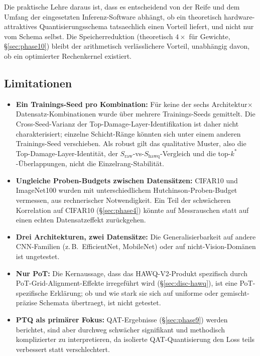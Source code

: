 Die praktische Lehre daraus ist, dass es entscheidend von der Reife und dem Umfang der eingesetzten Inferenz-Software abhängt, ob ein theoretisch hardware-attraktives Quantisierungsschema tatsaechlich einen Vorteil liefert, und nicht nur vom Schema selbst. Die Speicherreduktion (theoretisch $4\times$ für Gewichte, \S\ref{sec:phase10}) bleibt der arithmetisch verlässlichere Vorteil, unabhängig davon, ob ein optimierter Rechenkernel existiert.

\subsection{Limitationen}
\label{sec:limitations}

\begin{itemize}
\item \textbf{Ein Trainings-Seed pro Kombination:} Für keine der sechs Architektur$\times$Datensatz-Kombinationen wurde über mehrere Trainings-Seeds gemittelt. Die Cross-Seed-Varianz der Top-Damage-Layer-Identifikation ist daher nicht charakterisiert; einzelne Schicht-Ränge könnten sich unter einem anderen Trainings-Seed verschieben. Als robust gilt das qualitative Muster, also die Top-Damage-Layer-Identität, der $S_{\mathrm{raw}}$-vs-$S_{\mathrm{hawq}}$-Vergleich und die top-$k^*$-Überlappungen, nicht die Einzelrang-Stabilität.

\item \textbf{Ungleiche Proben-Budgets zwischen Datensätzen:} CIFAR10 und ImageNet100 wurden mit unterschiedlichem Hutchinson-Proben-Budget vermessen, aus rechnerischer Notwendigkeit. Ein Teil der schwächeren Korrelation auf CIFAR10 (\S\ref{sec:phase4}) könnte auf Messrauschen statt auf einen echten Datensatzeffekt zurückgehen.

\item \textbf{Drei Architekturen, zwei Datensätze:} Die Generalisierbarkeit auf andere CNN-Familien (z.\,B.\ EfficientNet, MobileNet) oder auf nicht-Vision-Domänen ist ungetestet.

\item \textbf{Nur PoT:} Die Kernaussage, dass das HAWQ-V2-Produkt spezifisch durch PoT-Grid-Alignment-Effekte irregeführt wird (\S\ref{sec:disc-hawq}), ist eine PoT-spezifische Erklärung; ob und wie stark sie sich auf uniforme oder gemischt-präzise Schemata übertraegt, ist nicht getestet.

\item \textbf{PTQ als primärer Fokus:} QAT-Ergebnisse (\S\ref{sec:phase9}) werden berichtet, sind aber durchweg schwächer signifikant und methodisch komplizierter zu interpretieren, da isolierte QAT-Quantisierung den Loss teils verbessert statt verschlechtert.


\end{itemize}
